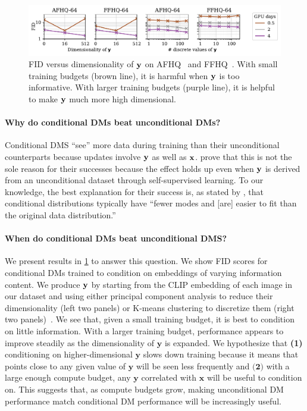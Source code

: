 \begin{figure}[t]
    \centering
    \includegraphics[width=\textwidth]{figs/2sdm/cond-results-vs-nclusters.pdf}
    \caption{FID versus dimensionality of ${\mathbf{y}}$ on AFHQ~\citep{choi2020stargan} and FFHQ~\citep{karras2018style}. With small training budgets (brown line), it is harmful when ${\mathbf{y}}$ is too informative. With larger training budgets (purple line), it is helpful to make ${\mathbf{y}}$ much more high dimensional.}
    \label{fig:fid-vs-ncomp}
\end{figure}

\paragraph{Why do conditional DMs beat unconditional DMs?}

Conditional DMS ``see'' more data during training than their unconditional counterparts because updates involve ${\mathbf{y}}$ as well as ${\mathbf{x}}$. \citet{bao2022conditional,hu2022self} prove that this is not the sole reason for their successes because the effect holds up even when ${\mathbf{y}}$ is derived from an unconditional dataset through self-supervised learning.
%
To our knowledge, the best explanation for their success is, as stated by \citet{bao2022conditional}, that conditional distributions typically have ``fewer modes and [are] easier to fit than the original data distribution.''

\paragraph{When do conditional DMs beat unconditional DMS?}
%
We present results in \cref{fig:fid-vs-ncomp} to answer this question. We show FID scores for conditional DMs trained to condition on embeddings of varying information content. 
%
We produce ${\mathbf{y}}$ by starting from the CLIP embedding of each image in our dataset and using either principal component analysis to reduce their dimensionality (left two panels) or K-means clustering to discretize them (right two panels)~\citep{hu2022self}.
%
We see that, given a small training budget, it is best to condition on little information. With a larger training budget, performance appears to improve steadily as the dimensionality of $\mathbf{y}$ is expanded. We hypothesize that \textbf{(1)} conditioning on higher-dimensional $\mathbf{y}$ slows down training because it means that points close to any given value of $\mathbf{y}$ will be seen less frequently and $\textbf{(2)}$ with a large enough compute budget, any $\mathbf{y}$ correlated with $\mathbf{x}$ will be useful to condition on. This suggests that, as compute budgets grow, making unconditional DM performance match conditional DM performance will be increasingly useful.




